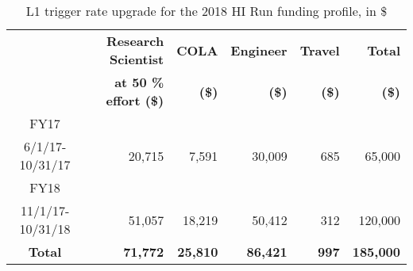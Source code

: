 \begin{table}[hbt]
\begin{center}
\begin{tabular}{|c|r|r|r|r|r|}
\hline
 
                &  \textbf{Research Scientist}  & \textbf{COLA}  & \textbf{Engineer} & \textbf{Travel}      &  \textbf{Total}\\
                &  \textbf{at 50 \% effort (\$)}  & \textbf{(\$)}  & \textbf{(\$)} & \textbf{(\$)}      &  \textbf{(\$)}\\ \hline
FY17            &              &        &          &           &         \\
6/1/17-10/31/17  & 20,715      & 7,591  &  30,009  & 685       &  65,000    \\\hline
FY18             &              &        &          &           &         \\
11/1/17-10/31/18  & 51,057    & 18,219   &  50,412     &  312 & 120,000   \\\hline
\textbf{Total}  & \textbf{71,772}    & \textbf{25,810}   &  \textbf{86,421}     &  \textbf{997} & \textbf{185,000} \\\hline
\end{tabular}
\end{center}
\caption{L1 trigger rate upgrade for the 2018 HI Run funding profile, in \$}
\label{OpCost}
\end{table}
